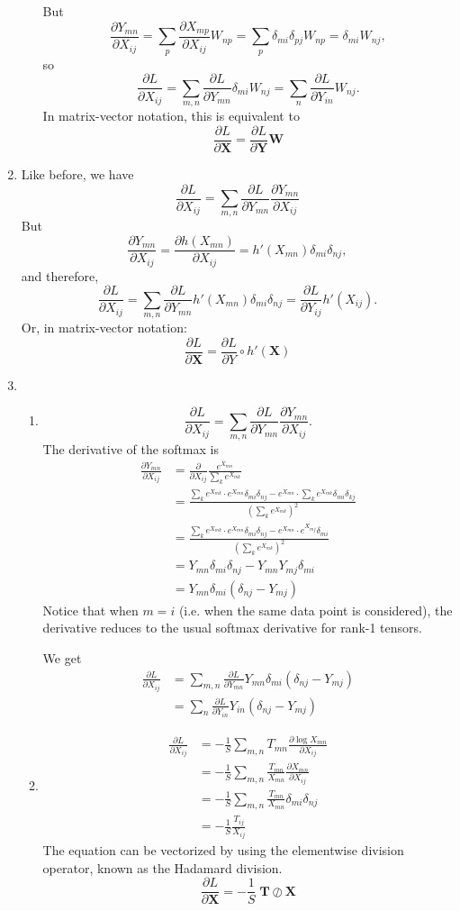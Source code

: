 \documentclass{article}
\renewcommand{\b}[1]{\boldsymbol{#1}}
\newcommand{\pfrac}[2]{\frac{\partial #1}{\partial #2}}
\begin{document}
\begin{enumerate}[label=(\alph*)]
\begin{enumerate}[label=(\roman*)]
$$	$$ But
	$$
	\pfrac{Y_{mn}}{X_{ij}} = \sum_p\pfrac{X_{mp}}{X_{ij}}W_{np} = \sum_p\delta_{mi}\delta_{pj}W_{np} = \delta_{mi}W_{nj},
	$$
	so
	$$
	\pfrac{L}{X_{ij}} = \sum_{m, n}\pfrac{L}{Y_{mn}}\delta_{mi}W_{nj} = \sum_n \pfrac{L}{Y_{in}}W_{nj}.
	$$ In matrix-vector notation, this is equivalent to
	$$
	\pfrac{L}{\b X} = \pfrac{L}{\b Y}\b W
	$$
\end{enumerate}
	\item Like before, we have
	$$
	\pfrac{L}{X_{ij}} = \sum_{m, n}\pfrac{L}{Y_{mn}}\pfrac{Y_{mn}}{X_{ij}}
	$$ But
	$$
	\pfrac{Y_{mn}}{X_{ij}} = \pfrac{h(X_{mn})}{X_{ij}} = h'(X_{mn})\delta_{mi}\delta_{nj},
	$$ and therefore,
	$$
	\pfrac{L}{X_{ij}} = \sum_{m, n}\pfrac{L}{Y_{mn}}h'(X_{mn})\delta_{mi}\delta_{nj} = \pfrac{L}{Y_{ij}}h'(X_{ij}).
	$$ Or, in matrix-vector notation:
	$$\pfrac{L}{\b X} = \pfrac{L}{Y} \circ h'(\b X)$$
	\item
	\begin{enumerate}[label=(\roman*)]
		\item
		$$
		 \pfrac{L}{X_{ij}} = \sum_{m, n}\pfrac{L}{Y_{mn}}\pfrac{Y_{mn}}{X_{ij}}.
		$$ The derivative of the softmax is
		$$
		\begin{aligned}
		\pfrac{Y_{mn}}{X_{ij}} &= \pfrac{}{X_{ij}} \frac{e^{X_{mn}}}{\sum_ke^{X_{mk}}} \\ &= \frac{\sum_ke^{X_{mk}} \cdot e^{X_{mn}}\delta_{mi}\delta_{nj} - e^{X_{mn}}\cdot\sum_ke^{X_{mk}}\delta_{mi}\delta_{kj}}{\left(\sum_ke^{X_{mk}}\right)^2} \\ &= \frac{\sum_ke^{X_{mk}} \cdot e^{X_{mn}}\delta_{mi}\delta_{nj} - e^{X_{mn}}\cdot e^{X_{mj}}\delta_{mi}}{\left(\sum_ke^{X_{mk}}\right)^2}\\
		&= Y_{mn}\delta_{mi}\delta_{nj} - Y_{mn}Y_{mj}\delta_{mi} \\ &= Y_{mn}\delta_{mi}\left(\delta_{nj} - Y_{mj}\right)
		\end{aligned}
		$$ Notice that when $m = i$ (i.e. when the same data point is considered), the derivative reduces to the usual softmax derivative for rank-1 tensors.
		
		We get
		$$
		\begin{aligned}
		\pfrac{L}{X_{ij}} &= \sum_{m, n}\pfrac{L}{Y_{mn}}Y_{mn}\delta_{mi}\left(\delta_{nj} - Y_{mj}\right) \\ &= \sum_n\pfrac{L}{Y_{in}}Y_{in}\left(\delta_{nj} - Y_{mj}\right)
		\end{aligned}
		$$
		\item 
		$$
		\begin{aligned}
		\pfrac{L}{X_{ij}} &= -\frac{1}{S}\sum_{m, n}T_{mn}\pfrac{\log X_{mn}}{X_{ij} }\\ &= -\frac{1}{S}\sum_{m, n}\frac{T_{mn}}{X_{mn}}\pfrac{X_{mn}}{X_{ij}} \\ &= -\frac{1}{S}\sum_{m, n}\frac{T_{mn}}{X_{mn}}\delta_{mi}\delta_{nj} \\ &= -\frac{1}{S}\frac{T_{ij}}{X_{ij}}
		\end{aligned}
		$$ The equation can be vectorized by using the elementwise division operator, known as the Hadamard division.
		$$
		\pfrac{L}{\b X} = -\frac{1}{S} \; \b T \oslash \b X
		$$
	\end{enumerate}
\end{enumerate}
\end{document}
